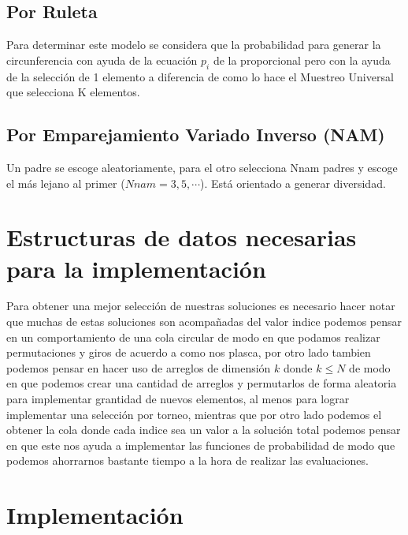 \documentclass[10pt]{article}
\begin{document}
\subsection{Por Ruleta}
Para determinar este modelo se considera que la probabilidad para generar la circunferencia con ayuda de la ecuación \(\displaystyle p_{i}\) de la proporcional pero con la ayuda de la selección de 1 elemento a diferencia de como lo hace el Muestreo Universal que selecciona K elementos.

\subsection{Por Emparejamiento Variado Inverso (NAM)}
Un padre se escoge aleatoriamente, para el otro selecciona Nnam padres y escoge el más lejano al primer (\(\displaystyle Nnam=3,5,\cdots\)). Está orientado a generar diversidad.
\section{Estructuras de datos necesarias para la implementación}
Para obtener una mejor selección de nuestras soluciones es necesario hacer notar que muchas de estas soluciones son acompañadas del valor indice podemos pensar en un comportamiento de una cola circular de modo en que podamos realizar permutaciones y giros de acuerdo a como nos plasca, por otro lado tambien podemos pensar en hacer uso de arreglos de dimensión $k$ donde $k\leq N$ de modo en que podemos crear una cantidad de arreglos y permutarlos de forma aleatoria para implementar grantidad de nuevos elementos, al menos para lograr implementar una selección por torneo, mientras que por otro lado podemos el obtener la cola donde cada indice sea un valor a la solución total podemos pensar en que este nos ayuda a implementar las funciones de probabilidad de modo que podemos ahorrarnos bastante tiempo a la hora de realizar las evaluaciones.
\section{Implementación}

\end{document}
